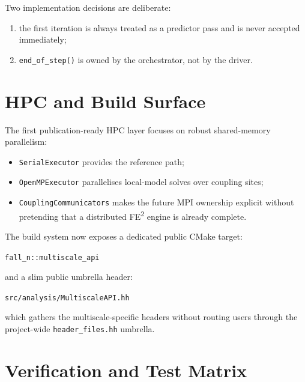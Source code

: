Two implementation decisions are deliberate:
\begin{enumerate}
  \item the first iteration is always treated as a predictor pass and is never
    accepted immediately;
  \item \texttt{end\_of\_step()} is owned by the orchestrator, not by the
    driver.
\end{enumerate}

\section{HPC and Build Surface}
\label{sec:ms-pub-hpc}

The first publication-ready HPC layer focuses on robust shared-memory
parallelism:
\begin{itemize}
  \item \texttt{SerialExecutor} provides the reference path;
  \item \texttt{OpenMPExecutor} parallelises local-model solves over coupling
    sites;
  \item \texttt{CouplingCommunicators} makes the future MPI ownership explicit
    without pretending that a distributed FE\textsuperscript{2} engine is
    already complete.
\end{itemize}

The build system now exposes a dedicated public CMake target:
\begin{center}
\texttt{fall\_n::multiscale\_api}
\end{center}
and a slim public umbrella header:
\begin{center}
\texttt{src/analysis/MultiscaleAPI.hh}
\end{center}
which gathers the multiscale-specific headers without routing users through the
project-wide \texttt{header\_files.hh} umbrella.

\section{Verification and Test Matrix}
\label{sec:ms-pub-tests}

